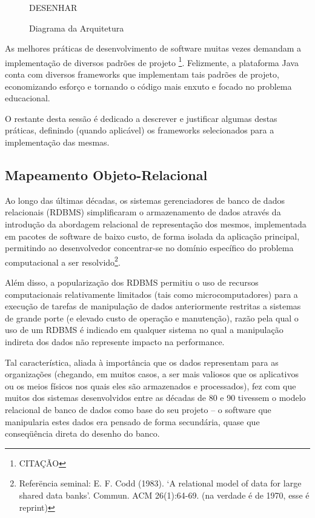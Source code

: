 \documentclass{abnt}
\begin{document}
\begin{figure}[htbp]
\begin{center}
DESENHAR
\caption{Diagrama da Arquitetura}
\label{default}
\end{center}
\end{figure}


As melhores práticas de desenvolvimento de software muitas vezes demandam a implementação de diversos padrões de projeto \footnote{CITAÇÃO}. Felizmente, a plataforma Java conta com diversos frameworks que implementam tais padrões de projeto, economizando esforço e tornando o código mais enxuto e focado no problema educacional.

O restante desta sessão é dedicado a descrever e justificar algumas destas práticas, definindo (quando aplicável) os frameworks selecionados para a implementação das mesmas.

\subsection{Mapeamento Objeto-Relacional}

Ao longo das últimas décadas, os sistemas gerenciadores de banco de dados relacionais (RDBMS)  simplificaram o armazenamento de dados através da introdução da abordagem relacional de representação dos mesmos, implementada em pacotes de software de baixo custo, de forma isolada da aplicação principal, permitindo ao desenvolvedor concentrar-se no domínio específico do problema computacional a ser resolvido\footnote{Referëncia seminal: E. F. Codd (1983). `A relational model of data for large shared data banks'. Commun. ACM 26(1):64-69. (na verdade é de 1970, esse é reprint)}.

Além disso, a popularização dos RDBMS permitiu o uso de recursos computacionais relativamente limitados (tais como microcomputadores) para a execução de tarefas de manipulação de dados anteriormente restritas a sistemas de grande porte (e elevado custo de operação e manutenção), razão pela qual o uso de um RDBMS é indicado em qualquer sistema no qual a manipulação indireta dos dados não represente impacto na performance.

Tal característica, aliada à importância que os dados representam para as organizações (chegando, em muitos casos, a ser mais valiosos que os aplicativos ou os meios físicos nos quais eles são armazenados e processados), fez com que muitos dos sistemas desenvolvidos entre as décadas de 80 e 90 tivessem o modelo relacional de banco de dados como base do seu projeto – o software que manipularia estes dados era pensado de forma secundária, quase que conseqüência direta do desenho do banco.
\end{document}
